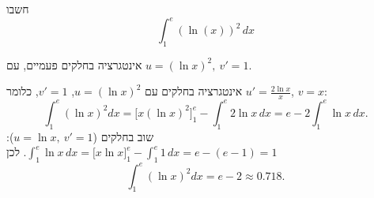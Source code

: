 
\begin{question}
חשבו
\[ \int_1^e(\ln(x))^2\,dx \]
\end{question}

\begin{hint}
אינטגרציה בחלקים פעמיים, עם $u=(\ln x)^2,\ v'=1$.
\end{hint}

\begin{solution}
אינטגרציה בחלקים עם $u=(\ln x)^2$, $v'=1$, כלומר $u'=\frac{2\ln x}{x}$, $v=x$:
\[ \int_1^e(\ln x)^2dx=\Big[x(\ln x)^2\Big]_1^e-\int_1^e 2\ln x\,dx=e-2\int_1^e\ln x\,dx. \]
שוב בחלקים ($u=\ln x,\ v'=1$): $\int_1^e\ln x\,dx=\big[x\ln x\big]_1^e-\int_1^e1\,dx=e-(e-1)=1$. לכן
\[ \int_1^e(\ln x)^2dx=\boxed{e-2}\approx0.718. \]
\end{solution}

